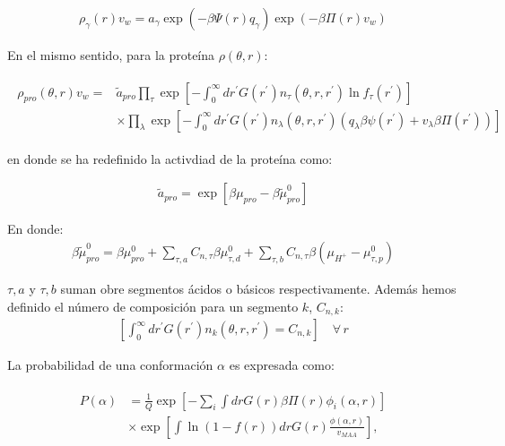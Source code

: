 \begin{align}
	\rho_\gamma(r)v_w = a_\gamma \exp{\left(-\beta \Psi(r)q_\gamma\right)} \exp{\left(-\beta\Pi(r) v_w\right)}
\end{align}


En el mismo sentido, para la prote\'ina $\rho(\theta,r)$:
	
	
	
	\begin{align}
		\begin{aligned}
			\rho_{pro}(\theta, r)v_w = & \tilde{a}_{pro} \prod_\tau \exp\left[ -\int_0^\infty dr^\prime G(r^\prime) n_\tau(\theta,r,r^\prime) \ln f_\tau(r^\prime)\right] \\
			& \times \prod_\lambda \exp\left[ -\int_0^\infty dr^\prime G(r^\prime) n_\lambda(\theta,r,r^\prime)\left(q_\lambda \beta\psi(r^\prime) + v_\lambda \beta \Pi(r^\prime)\right)\right]
		\end{aligned}
	\end{align}
	
	\noindent en donde se ha redefinido la activdiad de la prote\'ina como:
	
	\begin{align}
		\tilde{a}_{pro} = \exp[\beta\mu_{pro} - \beta\tilde{\mu}^0_{pro}]
	\end{align}
	
	En donde:
\begin{align}
	\beta\tilde{\mu}^0_{pro} =  \beta \mu^0_{pro}  + \sum_{\tau,a} C_{n,\tau}\beta\mu^0_{\tau,d} 
	+ \sum_{\tau,b} C_{n,\tau}\beta(\mu_{H^+} - \mu^0_{\tau,p})
\end{align}


\noindent $\tau,a$ y  $\tau,b$ suman obre segmentos \'acidos o b\'asicos respectivamente. Adem\'as hemos definido el n\'umero de composici\'on para un segmento $k$, $C_{n,k}$:
	\begin{align}
		\left[\int_0^\infty dr^\prime G(r^\prime) n_k(\theta,r,r^\prime) = C_{n,k}\right] \quad \forall \, r
		\label{eq:esf:composition}
	\end{align}

	La probabilidad de una conformaci\'on $\alpha$ es expresada como:
	
	\begin{align}
		\begin{aligned}
			P(\alpha)&=\frac{1}{Q}\exp\left[- \sum_i{\int{drG(r)\beta\Pi(r)\phi_i(\alpha,r)}}\right] \\
			& \times \exp\left[\int{\ln(1-f(r))drG(r)\frac{\phi(\alpha,r)}{v_{MAA}}}\right], \\
		\end{aligned}
	\end{align}
	
